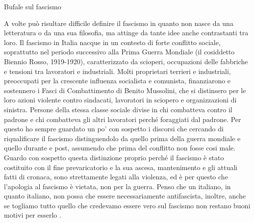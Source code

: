 \documentclass[12pt]{book} %
\begin{document}
\begin{mdframed}[linewidth=1pt]
Bufale sul fascismo

A volte può risultare difficile definire il fascismo in quanto non nasce da una letteratura o da una sua filosofia, ma attinge da tante idee anche contrastanti tra loro. 
Il fascismo in Italia nacque in un contesto di forte conflitto sociale, soprattutto nel periodo successivo alla Prima Guerra Mondiale (il cosiddetto Biennio Rosso, 1919-1920), caratterizzato da scioperi, occupazioni delle fabbriche e tensioni tra lavoratori e industriali.
Molti proprietari terrieri e industriali, preoccupati per la crescente influenza socialista e comunista, finanziarono e sostennero i Fasci di Combattimento di Benito Mussolini, che si distinsero per le loro azioni violente contro sindacati, lavoratori in sciopero e organizzazioni di sinistra. Persone della stessa classe sociale divise in chi combatteva contro il padrone e chi combatteva gli altri lavoratori perché foraggiati dal padrone.
Per questo ho sempre guardato un po' con sospetto i discorsi che cercando di riqualificare il fascismo distinguendolo da quello prima della guerra mondiale e quello durante e post, assumendo che prima del conflitto non fosse cosi male. Guardo con sospetto questa distinzione proprio perché il fascismo è stato costituito con il fine prevaricatorio e la sua ascesa, mantenimento e gli attuali fatti di cronaca, sono strettamente legati alla violenza, ed è per questo che l'apologia al fascismo è vietata, non per la guerra. Penso che un italiano, in quanto italiano, non possa che essere necessariamente antifascista, inoltre, anche se togliamo tutto quello che credevamo essere vero sul fascismo non restano buoni motivi per
esserlo  .


\end{mdframed}
\end{document}
